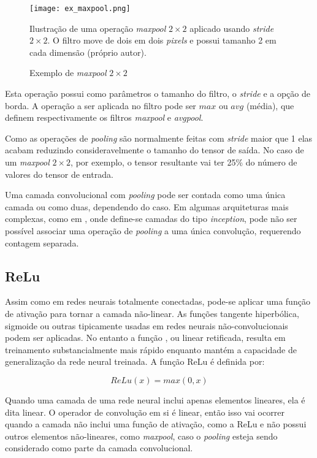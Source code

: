 \begin{figure}[!htb]
	\centering
	\texttt{[image: ex\_maxpool.png]}
	\caption{Exemplo de \emph{maxpool} $2 \times 2$}
	\label{fig:ex_maxpool}
	Ilustração de uma operação \emph{maxpool} $2 \times 2$ aplicado usando
	\emph{stride} $2 \times 2$. O filtro move de dois em dois \emph{pixels}
	e possui tamanho 2 em cada dimensão (próprio autor).
\end{figure}

Esta operação possui como parâmetros o tamanho do filtro, o \emph{stride} e
a opção de
borda. A operação a ser aplicada no filtro pode ser $max$ ou $avg$ (média),
que definem respectivamente os filtros \emph{maxpool} e \emph{avgpool}.

Como as operações de \emph{pooling} são normalmente feitas com \emph{stride}
maior que 1 elas
acabam reduzindo consideravelmente o tamanho do tensor de saída. No caso de um
\emph{maxpool} $2 \times 2$, por exemplo, o tensor resultante vai ter 25\% do
número de valores do tensor de entrada.

Uma camada convolucional com \emph{pooling} pode ser contada como uma única
camada ou
como duas, dependendo do caso. Em algumas arquiteturas mais complexas, como em
\cite{szegedy2015going}, onde define-se camadas do tipo \emph{inception},
pode não ser possível associar uma operação de \emph{pooling} a uma única
convolução, requerendo contagem separada.

\subsection{ReLu}
Assim como em redes neurais totalmente conectadas, pode-se aplicar uma função
de ativação para tornar a camada não-linear. As funções tangente
hiperbólica, sigmoide ou outras tipicamente usadas em redes neurais
não-convolucionais podem ser aplicadas. No entanto a função
, ou
linear retificada, resulta em treinamento substancialmente mais rápido enquanto
mantém a capacidade de generalização da rede neural treinada. A função
ReLu é definida por:


\begin{equation}
	ReLu(x) = max(0,x)
\end{equation}

Quando uma camada de uma rede neural inclui apenas elementos lineares,
ela é dita linear. O operador de convolução em si é linear, então
isso vai ocorrer quando a camada não inclui uma função de ativação, como
a ReLu e não possui outros elementos não-lineares, como \emph{maxpool},
caso o \emph{pooling} esteja sendo considerado como parte da camada
convolucional.

